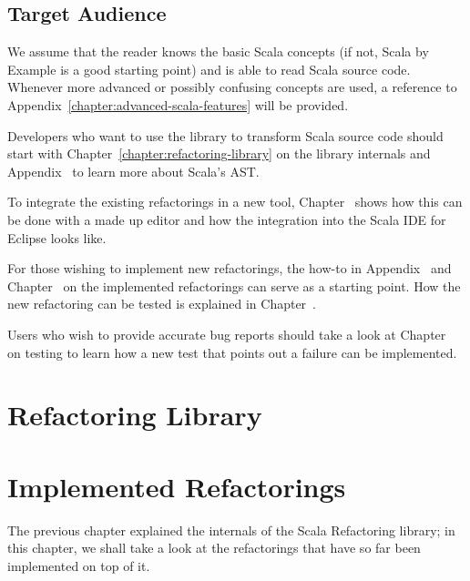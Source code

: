 \documentclass[10pt,a4paper,oneside]{scrreprt}
\begin{document}
\section{Target Audience}

We assume that the reader knows the basic Scala concepts (if not, Scala by Example \cite{ScalaByExample} is a good starting point) and is able to read Scala source code. Whenever more advanced or possibly confusing concepts are used, a reference to Appendix~\ref{chapter:advanced-scala-features} will be provided.

Developers who want to use the library to transform Scala source code should start with Chapter~\vref{chapter:refactoring-library} on the library internals and Appendix~ to learn more about Scala's AST. 

To integrate the existing refactorings in a new tool, Chapter~ shows how this can be done with a made up editor and how the integration into the Scala IDE for Eclipse looks like.

For those wishing to implement new refactorings, the how-to in Appendix~ and Chapter~ on the implemented refactorings can serve as a starting point. How the new refactoring can be tested is explained in Chapter~.

Users who wish to provide accurate bug reports should take a look at Chapter~ on testing to learn how a new test that points out a failure can be implemented.

\emptypage

\chapter{Refactoring Library} \label{chapter:refactoring-library}

 \label{end-chapter:refactoring-library}

\emptypage

\chapter{Implemented Refactorings} \label{chapter:implemented-refactorings}

The previous chapter explained the internals of the Scala Refactoring library; in this chapter, we shall take a look at the refactorings that have so far been implemented on top of it. 
\end{document}
